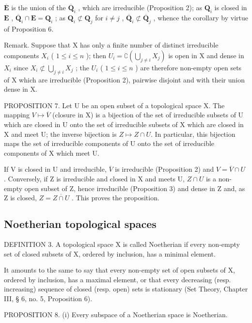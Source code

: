 \(\overline{\mathbf{E}}\) is the union of the \(\overline{\mathbf{Q}}_i\) , which are irreducible (Proposition 2); as \(\mathbf{Q}_i\) is closed in \(\mathbf{E}\) , \(\overline{\mathbf{Q}}_i \cap \mathbf{E} = \mathbf{Q}_i\) ; as \(\mathbf{Q}_i \not\subset \mathbf{Q}_j\) for \(i \neq j\) , \(\overline{\mathbf{Q}}_i \not\subset \overline{\mathbf{Q}}_j\) , whence the corollary by virtue of Proposition 6.

Remark. Suppose that X has only a finite number of distinct irreducible components \(X_{i}\) ( \(1 \leqslant i \leqslant n\) ); then \(U_{i} = \complement\left(\bigcup_{j \neq i} X_{j}\right)\) is open in X and dense in \(X_{i}\) since \(X_{i} \not\subset \bigcup_{j \neq i} X_{j}\) ; the \(U_{i}\) ( \(1 \leqslant i \leqslant n\) ) are therefore non-empty open sets of X which are irreducible (Proposition 2), pairwise disjoint and with their union dense in X.

PROPOSITION 7. Let U be an open subset of a topological space X. The mapping \(V \mapsto \overline{V}\) (closure in X) is a bijection of the set of irreducible subsets of U which are closed in U onto the set of irreducible subsets of X which are closed in X and meet U; the inverse bijection is \(Z \mapsto Z \cap U\). In particular, this bijection maps the set of irreducible components of U onto the set of irreducible components of X which meet U.

If V is closed in U and irreducible, \(\overline{V}\) is irreducible (Proposition 2) and \(V = \overline{V} \cap U\) . Conversely, if Z is irreducible and closed in X and meets U, \(Z \cap U\) is a non-empty open subset of Z, hence irreducible (Proposition 3) and dense in Z and, as Z is closed, \(Z = \overline{Z \cap U}\) . This proves the proposition.

\subsection{Noetherian topological spaces}

DEFINITION 3. A topological space X is called Noetherian if every non-empty set of closed subsets of X, ordered by inclusion, has a minimal element.

It amounts to the same to say that every non-empty set of open subsets of X, ordered by inclusion, has a maximal element, or that every decreasing (resp. increasing) sequence of closed (resp. open) sets is stationary (Set Theory, Chapter III, § 6, no. 5, Proposition 6).

PROPOSITION 8. (i) Every subspace of a Noetherian space is Noetherian.

